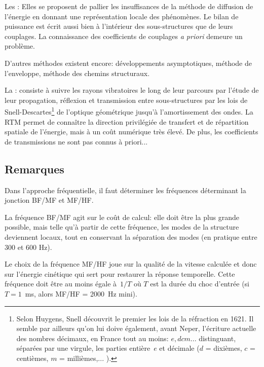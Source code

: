 \bigskip
Les : Elles se proposent de pallier les insuffisances de la méthode de diffusion de l'énergie en donnant une représentation locale des phénomènes. Le bilan de puissance est écrit aussi bien à l'intérieur des sous-structures que de leurs couplages. La connaissance des coefficients de couplages \emph{a priori} demeure un problème.

\bigskip
D'autres méthodes existent encore: développements asymptotiques, méthode de l'enveloppe, méthode des chemins structuraux.

La : consiste à suivre les rayons vibratoires le long de leur parcours par l'étude de leur propagation, réflexion et transmission entre sous-structures par les lois de Snell-Descartes\footnote{Selon Huygens, Snell découvrit le premier les lois de la réfraction en 1621. Il semble par ailleurs qu'on lui doive également, avant Neper, l'écriture actuelle des nombres décimaux, en France tout au moins: $e,dcm...$ distinguant, séparées par une virgule, les parties entière~$e$ et décimale ($d$ = dixièmes, $c$ = centièmes, $m$ = millièmes,... ).} de l'optique géométrique jusqu'à l'amortissement des ondes. La RTM permet de connaître la direction privilégiée de transfert et de répartition spatiale de l'énergie, mais à un coût numérique très élevé. De plus, les coefficients de transmissions ne sont pas connus à priori...

\medskip
\subsection{Remarques}

Dans l'approche fréquentielle, il faut déterminer les fréquences déterminant la jonction BF/MF et MF/HF.

La fréquence BF/MF agit sur le coût de calcul: elle doit être la plus grande possible, mais telle qu'à partir de cette fréquence, les modes de la structure deviennent locaux, tout en conservant la séparation des modes (en pratique entre 300 et 600 Hz).

Le choix de la fréquence MF/HF joue sur la qualité de la vitesse calculée et donc sur l'énergie cinétique qui sert pour restaurer la réponse temporelle. Cette fréquence doit être au moins égale à~$1/T$ où $T$ est la durée du choc d'entrée (si~$T=1$~ms, alors MF/HF = 2000~Hz mini).

